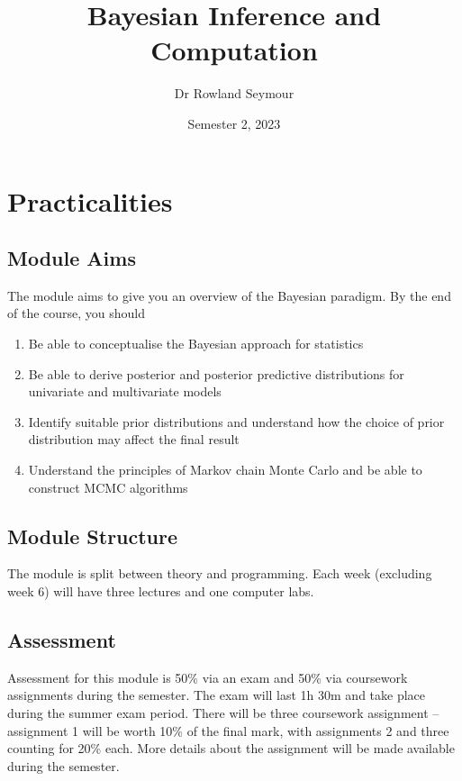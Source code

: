 \documentclass[
]{book}
\title{Bayesian Inference and Computation}
\author{Dr Rowland Seymour}
\date{Semester 2, 2023}
\theoremstyle{definition}
\theoremstyle{definition}
\theoremstyle{definition}
\theoremstyle{definition}
\theoremstyle{remark}
\begin{document}
\maketitle

{
\setcounter{tocdepth}{1}
\tableofcontents
}
\hypertarget{practicalities}{%
\chapter*{Practicalities}\label{practicalities}}

\hypertarget{module-aims}{%
\section{Module Aims}\label{module-aims}}

The module aims to give you an overview of the Bayesian paradigm. By the end of the course, you should

\begin{enumerate}
\def\labelenumi{\arabic{enumi}.}
\item
  Be able to conceptualise the Bayesian approach for statistics
\item
  Be able to derive posterior and posterior predictive distributions for univariate and multivariate models
\item
  Identify suitable prior distributions and understand how the choice of prior distribution may affect the final result
\item
  Understand the principles of Markov chain Monte Carlo and be able to construct MCMC algorithms
\end{enumerate}

\hypertarget{module-structure}{%
\section{Module Structure}\label{module-structure}}

The module is split between theory and programming. Each week (excluding week 6) will have three lectures and one computer labs.

\hypertarget{assessment}{%
\section{Assessment}\label{assessment}}

Assessment for this module is 50\% via an exam and 50\% via coursework assignments during the semester. The exam will last 1h 30m and take place during the summer exam period. There will be three coursework assignment -- assignment 1 will be worth 10\% of the final mark, with assignments 2 and three counting for 20\% each. More details about the assignment will be made available during the semester.
\end{document}
